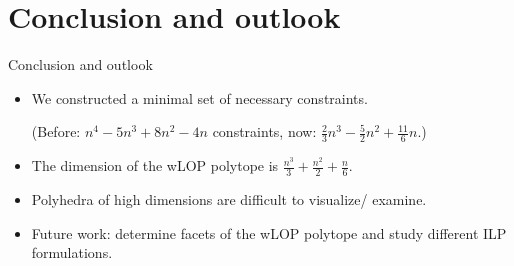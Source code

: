 \documentclass[xcolor=dvipsnames]{beamer}
\numberwithin{bsp}{section}
\numberwithin{figure}{section}
\begin{document}
\section{Conclusion and outlook}

\begin{frame}{Conclusion and outlook}
	\begin{itemize}
		\item We constructed a minimal set of necessary constraints. 
		
		(Before: $n^{4}-5n^{3}+8n^{2}-4n$ constraints, now: $\frac{2}{3}n^3- \frac{5}{2}n^2 + \frac{11}{6}n$.)
		\item The dimension of the wLOP polytope is $\frac{n^3}{3}+ \frac{n^2}{2} + \frac{n}{6}$.
		\item Polyhedra of high dimensions are difficult to visualize/ examine.
		\item Future work: determine facets of the wLOP polytope and study different ILP formulations.
	\end{itemize}
\end{frame}



\begin{frame}[plain]{\titlepage}\end{frame}
\end{document}
